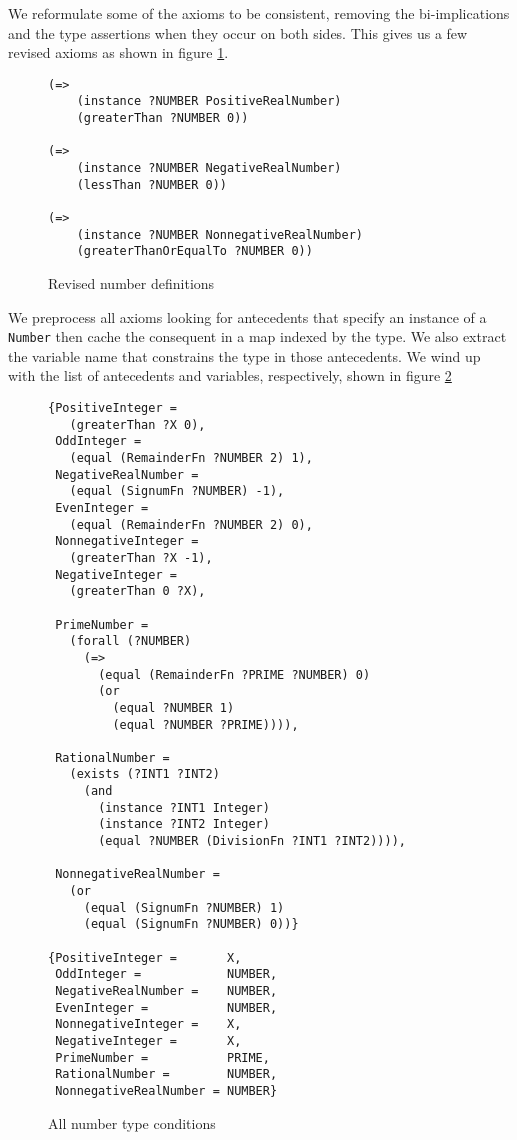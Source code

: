 \documentclass{article}
\begin{document}
We reformulate some of the axioms to be consistent, removing the bi-implications
and the type assertions when they occur on both sides.  This gives us a few revised
axioms as shown in figure \ref{fig:RevNumberDefs}.

\begin{figure}[H]
\begin{framed}
\begin{verbatim}
(=>
    (instance ?NUMBER PositiveRealNumber)
    (greaterThan ?NUMBER 0))

(=>
    (instance ?NUMBER NegativeRealNumber)
    (lessThan ?NUMBER 0))	

(=>
    (instance ?NUMBER NonnegativeRealNumber)
    (greaterThanOrEqualTo ?NUMBER 0))
\end{verbatim}
\end{framed}
\caption{Revised number definitions}
\label{fig:RevNumberDefs}
\end{figure}

We preprocess all axioms looking for antecedents that specify an instance of a
\texttt{Number} then cache the consequent in a map indexed by the type.  We also
extract the variable name that constrains the type in those antecedents.  We wind up
with the list of antecedents and variables, respectively, shown in figure \ref{fig:NumTypeConAll}

\begin{figure}[H]
\begin{framed}
\begin{verbatim}
{PositiveInteger =
   (greaterThan ?X 0), 
 OddInteger = 
   (equal (RemainderFn ?NUMBER 2) 1), 
 NegativeRealNumber = 
   (equal (SignumFn ?NUMBER) -1), 
 EvenInteger = 
   (equal (RemainderFn ?NUMBER 2) 0),
 NonnegativeInteger = 
   (greaterThan ?X -1), 
 NegativeInteger = 
   (greaterThan 0 ?X), 

 PrimeNumber = 
   (forall (?NUMBER) 
     (=> 
       (equal (RemainderFn ?PRIME ?NUMBER) 0) 
       (or 
         (equal ?NUMBER 1) 
         (equal ?NUMBER ?PRIME)))), 

 RationalNumber = 
   (exists (?INT1 ?INT2) 
     (and 
       (instance ?INT1 Integer) 
       (instance ?INT2 Integer) 
       (equal ?NUMBER (DivisionFn ?INT1 ?INT2)))), 

 NonnegativeRealNumber = 
   (or 
     (equal (SignumFn ?NUMBER) 1) 
     (equal (SignumFn ?NUMBER) 0))}

{PositiveInteger =       X, 
 OddInteger =            NUMBER, 
 NegativeRealNumber =    NUMBER, 
 EvenInteger =           NUMBER, 
 NonnegativeInteger =    X, 
 NegativeInteger =       X, 
 PrimeNumber =           PRIME, 
 RationalNumber =        NUMBER, 
 NonnegativeRealNumber = NUMBER}
\end{verbatim}
\end{framed}
\caption{All number type conditions}
\label{fig:NumTypeConAll}
\end{figure}
\end{document}
